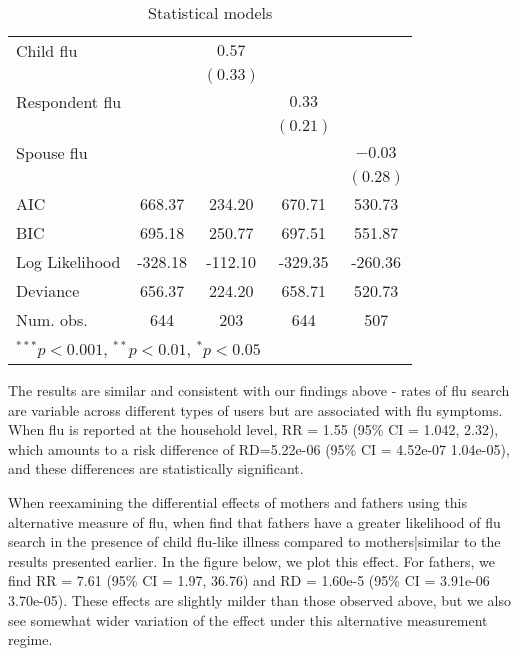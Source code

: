 \documentclass[12pt]{article}
\begin{document}
\begin{table}[h!]
\begin{center}
\begin{tabular}{l c c c c }
Child flu         &                & $0.57$         &                &                \\
               &                & $(0.33)$       &                &                \\
Respondent flu          &                &                & $0.33$         &                \\
               &                &                & $(0.21)$       &                \\
Spouse flu          &                &                &                & $-0.03$        \\
               &                &                &                & $(0.28)$       \\
\hline
AIC            & 668.37         & 234.20         & 670.71         & 530.73         \\
BIC            & 695.18         & 250.77         & 697.51         & 551.87         \\
Log Likelihood & -328.18        & -112.10        & -329.35        & -260.36        \\
Deviance       & 656.37         & 224.20         & 658.71         & 520.73         \\
Num. obs.      & 644            & 203            & 644            & 507            \\
\hline
\multicolumn{5}{l}{\scriptsize{$^{***}p<0.001$, $^{**}p<0.01$, $^*p<0.05$}}
\end{tabular}
\caption{Statistical models}
\label{table:coefficients}
\end{center}
\end{table}

The results are similar and consistent with our findings above - rates of flu search are variable across different types of users but are associated with flu symptoms. When flu is reported at the household level, RR = 1.55 (95\% CI = 1.042, 2.32), which amounts to a risk difference of RD=5.22e-06 (95\% CI = 4.52e-07 1.04e-05), and these differences are statistically significant.

When reexamining the differential effects of mothers and fathers using this alternative measure of flu, when find that fathers have a greater likelihood of flu search in the presence of child flu-like illness compared to mothers|similar to the results presented earlier. In the figure below, we plot this effect. For fathers, we find RR = 7.61 (95\% CI = 1.97, 36.76) and RD = 1.60e-5 (95\% CI = 3.91e-06 3.70e-05). These effects are slightly milder than those observed above, but we also see somewhat wider variation of the effect under this alternative measurement regime. %
\end{document}
